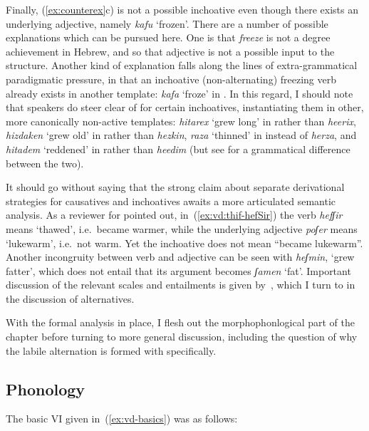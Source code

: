 \begin{exe}
\begin{xlist}
\begin{xlist}
\begin{exe}
\begin{exe}
\begin{xlist}
\begin{exe}
\begin{xlist}
\begin{exe}
\begin{xlist}
\begin{xlist}
\begin{exe}
\begin{xlist}
\begin{exe}
\begin{xlist}
\begin{exe}
\begin{exe}
\begin{exe}
\begin{xlist}
\begin{exe}
\begin{exe}
\begin{xlist}
\begin{xlist}
\begin{exe}
\begin{xlist}
\begin{exe}
\begin{exe}
\begin{exe}
\begin{xlist}
Finally, (\ref{ex:counterex}c) is not a possible inchoative even though there exists an underlying adjective, namely \emph{kafu} `frozen'. There are a number of possible explanations which can be pursued here. One is that \emph{freeze} is not a degree achievement in Hebrew, and so that adjective is not a possible input to the structure. Another kind of explanation falls along the lines of extra-grammatical paradigmatic pressure, in that an inchoative (non-alternating) freezing verb already exists in another template: \emph{kafa} `froze' in {\tkal}. In this regard, I should note that speakers do steer clear of {\thif} for certain inchoatives, instantiating them in other, more canonically non-active templates: \emph{hitarex} `grew long' in {\thit} rather than \emph{heerix}, \emph{hizdaken} `grew old' in {\thit} rather than \emph{hezkin}, \emph{raza} `thinned' in {\tkal} instead of \emph{herza}, and \emph{hitadem} `reddened' in {\thit} rather than \emph{heedim} (but see \citealt[22]{doron03} for a grammatical difference between the two).

It should go without saying that the strong claim about separate derivational strategies for causatives and inchoatives awaits a more articulated semantic analysis. As a reviewer for \cite{kastner19tlr} pointed out, in~(\ref{ex:vd:thif-hefSir}) the verb \emph{hefʃir} means `thawed', i.e.~became warmer, while the underlying adjective \emph{poʃer} means `lukewarm', i.e.~not warm. Yet the inchoative does not mean ``became lukewarm''. Another incongruity between verb and adjective can be seen with \emph{heʃmin}, `grew fatter', which does not entail that its argument becomes \emph{ʃamen} `fat'. Important discussion of the relevant scales and entailments is given by~\cite{borer91}, which I turn to in the discussion of alternatives.

With the formal analysis in place, I flesh out the morphophonlogical part of the chapter before turning to more general discussion, including the question of why the labile alternation is formed with {\vd} specifically.

	
	\subsection{Phonology} \label{vd:vd:phono}
The basic VI given in~(\ref{ex:vd-basics}) was as follows:
 \begin{exe}
\ex  {\vd} {\lra} {\thif} 
 \z 


\end{exe}
\end{xlist}
\end{exe}
\end{exe}
\end{exe}
\end{xlist}
\end{exe}
\end{xlist}
\end{xlist}
\end{exe}
\end{exe}
\end{xlist}
\end{exe}
\end{exe}
\end{exe}
\end{xlist}
\end{exe}
\end{xlist}
\end{exe}
\end{xlist}
\end{xlist}
\end{exe}
\end{xlist}
\end{exe}
\end{xlist}
\end{exe}
\end{exe}
\end{xlist}
\end{xlist}
\end{exe}
